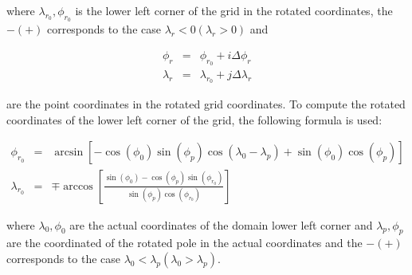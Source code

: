 where $\lambda_{r_0},\phi_{r_0}$ is the lower left corner of the grid in
the rotated coordinates, the $- (+)$ corresponds to the case $\lambda_r < 0
(\lambda_r > 0)$ and

\begin{eqnarray}
  \phi_r &=& \phi_{r_0} + i \Delta\phi_r \\
  \lambda_r &=& \lambda_{r_0} + j \Delta\lambda_r
\end{eqnarray}

are the point coordinates in the rotated grid coordinates. To compute the
rotated coordinates of the lower left corner of the grid, the following
formula is used:

\begin{eqnarray}
  \phi_{r_0} &=& \arcsin \left[ -\cos(\phi_0) \sin(\phi_p)
           \cos(\lambda_0 - \lambda_p) + \sin(\phi_0) \cos(\phi_p)\right] \\
  \lambda_{r_0} &=& \mp \arccos \left[\frac{\sin(\phi_0) -
          \cos(\phi_p) \sin(\phi_{r_0})}{\sin(\phi_p) \cos(\phi_{r_0})}\right]
\end{eqnarray}

where $\lambda_0,\phi_0$ are the actual coordinates of the domain lower left
corner and $\lambda_p,\phi_p$ are the coordinated of the rotated pole in the
actual coordinates and the $- (+)$ corresponds to the case
$\lambda_0 < \lambda_p (\lambda_0 > \lambda_p)$.

